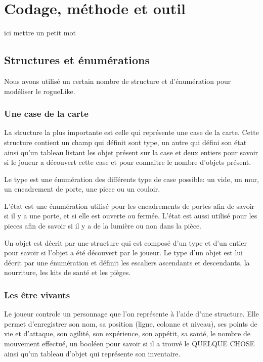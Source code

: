 \documentclass[11pt]{report}
\begin{document}
\chapter{Codage, méthode et outil}

ici mettre un petit mot

	\section{Structures et énumérations}
	
	Nous avons utilisé un certain nombre de structure et d'énumération pour modéliser le rogueLike.
	
		\subsection{Une case de la carte}
	
		La structure la plus importante est celle qui représente une case de la carte. Cette structure contient un champ qui définit sont type, un autre qui défini son état ainsi qu'un tableau listant les objet présent sur la case et deux entiers pour savoir si le joueur a découvert cette case et pour connaitre le nombre d'objets présent.
	
		Le type est une énumération des différents type de case possible: un vide, un mur, un encadrement de porte, une piece ou un couloir.
	
		L'état est une énumération utilisé pour les encadrements de portes afin de savoir si il y a une porte, et si elle est ouverte ou fermée. L'état est aussi utilisé pour les pieces afin de savoir si il y a de la lumière ou non dans la pièce.
	
		Un objet est décrit par une structure qui est composé d'un type et d'un entier pour savoir si l'objet a été découvert par le joueur. Le type d'un objet est lui décrit par une énumération et définit les escaliers ascendants et descendants, la nourriture, les kits de santé et les pièges.
		
		\subsection{Les être vivants}
		
		Le joueur controle un personnage que l'on représente à l'aide d'une structure. Elle permet d'enregistrer son nom, sa position (ligne, colonne et niveau), ses points de vie et d'attaque, son agilité, son expérience, son appétit, sa santé, le nombre de mouvement effectué, un booléen pour savoir si il a trouvé le QUELQUE CHOSE ainsi qu'un tableau d'objet qui représente son inventaire.
		
\end{document}
